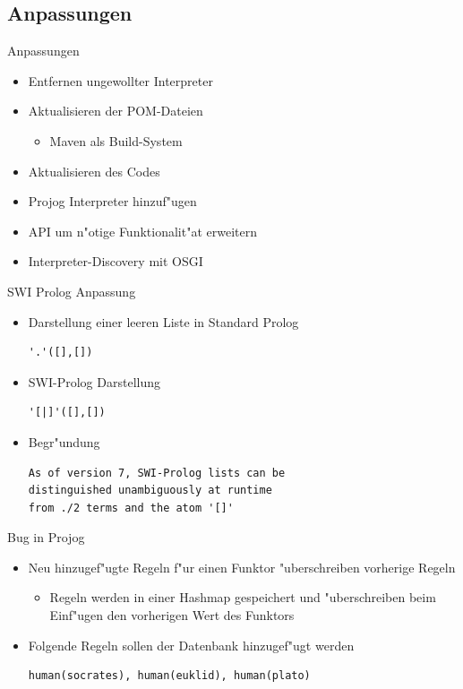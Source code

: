 \documentclass[18pt]{beamer}
\begin{document}
\subsection{Anpassungen}
\begin{frame}{Anpassungen}
\begin{itemize}
\item Entfernen ungewollter Interpreter
\item Aktualisieren der POM-Dateien
\begin{itemize}
\item Maven als Build-System
\end{itemize}
\item Aktualisieren des Codes
\item Projog Interpreter hinzuf"ugen
\item API um n"otige Funktionalit"at erweitern
\item Interpreter-Discovery mit OSGI
\end{itemize}
\end{frame}
\begin{frame}[fragile]{SWI Prolog Anpassung}
\begin{itemize}
\item Darstellung einer leeren Liste in Standard Prolog
\begin{verbatim}
'.'([],[])
\end{verbatim}
\item SWI-Prolog Darstellung
\begin{verbatim}
'[|]'([],[])
\end{verbatim}
\vspace{0.5cm}
\item Begr"undung
\begin{verbatim}
As of version 7, SWI-Prolog lists can be 
distinguished unambiguously at runtime
from ./2 terms and the atom '[]'
\end{verbatim}
\end{itemize}
\end{frame}
\begin{frame}[fragile]{Bug in Projog}
\begin{itemize}
\item Neu hinzugef"ugte Regeln f"ur einen Funktor "uberschreiben vorherige Regeln
\begin{itemize}
\item Regeln werden in einer Hashmap gespeichert und "uberschreiben beim Einf"ugen den vorherigen Wert des Funktors
\end{itemize}
\vspace{0.5cm}
\item Folgende Regeln sollen der Datenbank hinzugef"ugt werden
\begin{verbatim}
human(socrates), human(euklid), human(plato)
\end{verbatim}
\end{itemize}
\end{frame}
\end{document}
